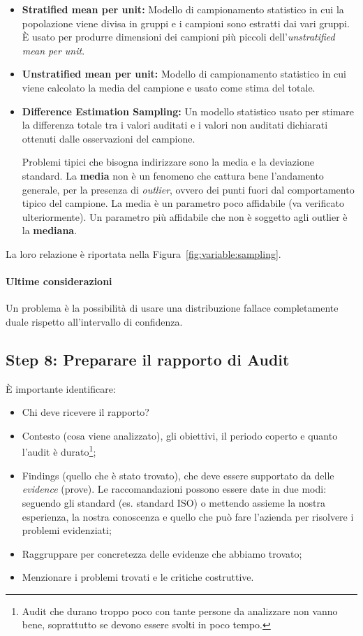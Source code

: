 \begin{itemize}
\item \textbf{Stratified mean per unit:}
Modello di campionamento statistico in cui la popolazione
viene divisa in gruppi e i campioni sono estratti dai vari
gruppi. È usato per produrre dimensioni dei campioni più piccoli
dell'\textit{unstratified mean per unit}.

\item \textbf{Unstratified mean per unit:}
Modello di campionamento statistico in cui viene calcolato la media
del campione e usato come stima del totale.


\item \textbf{Difference Estimation Sampling:} Un modello statistico
usato per stimare la differenza totale
tra i valori auditati e i valori non auditati dichiarati ottenuti
dalle osservazioni del campione.

Problemi tipici che bisogna indirizzare sono la media e la deviazione standard.
La \textbf{media} non è un fenomeno che cattura bene l'andamento generale, per la
presenza di \textit{outlier}, ovvero dei punti fuori dal comportamento
tipico del campione.
La media è un parametro poco affidabile (va verificato ulteriormente). Un
parametro più affidabile che non è soggetto agli
outlier è la \textbf{mediana}.
\end{itemize}

La loro relazione è riportata nella Figura~\ref{fig:variable:sampling}.


\paragraph*{Ultime considerazioni}
Un problema è la possibilità di usare una
distribuzione fallace completamente duale rispetto all'intervallo di
confidenza.



\subsection{Step 8: Preparare il rapporto di Audit}

È importante identificare:
\begin{itemize}
\item Chi deve ricevere il rapporto?
\item Contesto (cosa viene analizzato), gli obiettivi, il periodo coperto e
quanto l'audit è durato\footnote{Audit che durano troppo poco con tante persone
da analizzare non vanno bene, soprattutto se devono essere svolti in poco
tempo.};
\item Findings (quello che è stato trovato), che deve essere supportato da delle
\emph{evidence} (prove). Le raccomandazioni possono essere date in due modi:
seguendo gli standard (es. standard ISO) o mettendo assieme la nostra
esperienza, la nostra conoscenza e quello che può fare l'azienda per risolvere i
problemi evidenziati;
\item Raggruppare per concretezza delle evidenze che abbiamo trovato;
\item Menzionare i problemi trovati e le critiche costruttive.
\end{itemize}

